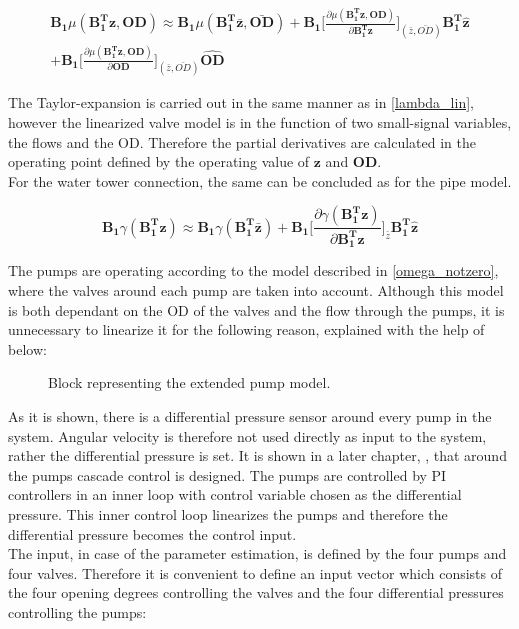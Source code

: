 \begin{equation}
\begin{split}
  \pmb{B_1} \mu(\pmb{{B_1^{T}}}\pmb{z}, \pmb{OD}) \approx \pmb{B_1} \mu(\pmb{B_1^T \bar{ z}}, \pmb{\bar{OD}}) + 
  \pmb{B_1} \bigg[ \frac{\partial{\mu(\pmb{{B_1^{T}}}\pmb{z}, \pmb{OD})}}{{\partial{\pmb{{B_1^{T}}}\pmb{z}}}}  \bigg]_{(\bar{z}, \bar{OD})} \pmb{{B_1^{T}}} \pmb{\hat{z}}
\\ +  \pmb{B_1} \bigg[ \frac{\partial{\mu(\pmb{{B_1^{T}}}\pmb{z}, \pmb{OD})}}{{\partial{\pmb{OD}}}}  \bigg]_{(\bar{z}, \bar{OD})} \pmb{\hat{OD}}
\label{mu_lin}
\end{split}
\end{equation}


The Taylor-expansion is carried out in the same manner as in \eqref{lambda_lin}, however the linearized valve model is in the function of two small-signal variables, the flows and the OD. Therefore the partial derivatives are calculated in the operating point defined by the operating value of $\pmb{z}$ and $\pmb{OD}$. 
\\
For the water tower connection, the same can be concluded as for the pipe model. 

\begin{equation}
  \pmb{B_1} \gamma(\pmb{{B_1^{T}}}\pmb{z}) \approx  \pmb{B_1} \gamma(\pmb{B_1^T \bar{ z}}) + \pmb{B_1} \bigg[ \frac{\partial{\gamma(\pmb{{B_1^{T}}}\pmb{z})}}{{\partial{\pmb{{B_1^{T}}}\pmb{z}}}}   \bigg]_{\bar{z}} \pmb{{B_1^{T}}}\pmb{\hat{z}}
\label{gamma_lin}
\end{equation}

The pumps are operating according to the model described in \eqref{omega_notzero}, where the valves around each pump are taken into account. Although this model is both dependant on the OD of the valves and the flow through the pumps, it is unnecessary to linearize it for the following reason, explained with the help of  below: 

\begin{figure}[H]
\centering
 
\caption{Block representing the extended pump model.}
\label{fig:pump_model_block}
\end{figure}

As it is shown, there is a differential pressure sensor around every pump in the system. Angular velocity is therefore not used directly as input to the system, rather the differential pressure is set. It is shown in a later chapter, , that around the pumps cascade control is designed. The pumps are controlled by PI controllers in an inner loop with control variable chosen as the differential pressure. This inner control loop linearizes the pumps and therefore the differential pressure becomes the control input. 
\\
The input, in case of the parameter estimation, is defined by the four pumps and four valves. Therefore it is convenient to define an input vector which consists of the four opening degrees controlling the valves and the four differential pressures controlling the pumps: 

